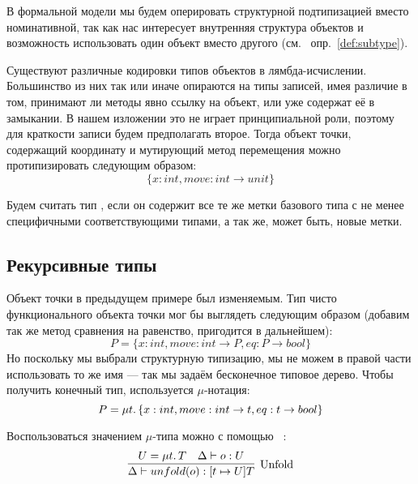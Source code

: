 В формальной модели мы будем оперировать структурной подтипизацией вместо номинативной, так как нас интересует внутренняя структура объектов и возможность использовать один объект вместо другого (см.
~опр.~\ref{def:subtype}).

Существуют различные кодировки типов объектов в лямбда-исчислении.
Большинство из них так или иначе опираются на типы записей, имея различие в том, принимают ли методы явно ссылку на объект, или уже содержат её в замыкании.
В нашем изложении это не играет принципиальной роли, поэтому для краткости записи будем предполагать второе.
Тогда объект точки, содержащий координату и мутирующий метод перемещения можно протипизировать следующим образом:
\begin{equation}
    \label{eq:mutable-point}
    \{ x : int, move : int \to unit \}
\end{equation}

Будем считать тип , если он содержит все те же метки базового типа с не менее специфичными соответствующими типами, а так же, может быть, новые метки.


\subsection{Рекурсивные типы} \label{subsec:recursive-types}

Объект точки в предыдущем примере был изменяемым.
Тип чисто функционального объекта точки мог бы выглядеть следующим образом (добавим так же метод сравнения на равенство, пригодится в дальнейшем):
\begin{equation*}
    P = \{ x : int, move : int \to P, eq : P \to bool \}
\end{equation*}
Но поскольку мы выбрали структурную типизацию, мы не можем в правой части использовать то же имя --- так мы задаём бесконечное типовое дерево.
Чтобы получить конечный тип, используется $\mu$-нотация:
\begin{equation}
    \label{eq:P}
    P = \mu t \ldotp \{ x : int, move : int \to t, eq : t \to bool \}
\end{equation}

Воспользоваться значением $\mu$-типа можно с помощью ~\cite{cook1989inheritance}:
\begin{equation}
    \label{eq:unfold}
    \infer[\text{Unfold}]{
        \Delta \vdash unfold(o) : [t \mapsto U]T
    }{
        U = \mu t \ldotp T & \Delta \vdash o : U
    }
\end{equation}

